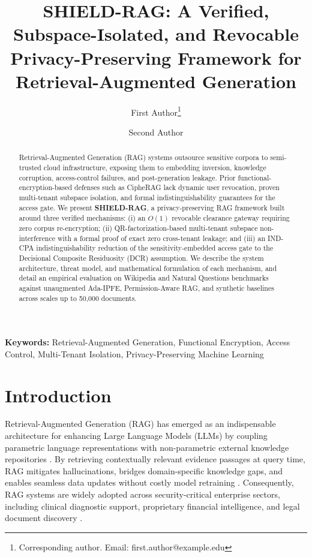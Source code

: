 \documentclass[10pt,a4paper]{article}
\title{\bfseries\fontsize{14pt}{16pt}\selectfont SHIELD-RAG: A Verified, Subspace-Isolated, and Revocable Privacy-Preserving Framework for Retrieval-Augmented Generation}
\author[1]{First Author\thanks{Corresponding author. Email: first.author@example.edu}}
\author[2]{Second Author}
\affil[1]{Department of Computer Science and Engineering, University Name, City, Country}
\affil[2]{Department of Computer Science and Engineering, University Name, City, Country}
\date{}
\begin{document}
\maketitle

\begin{abstract}
\noindent Retrieval-Augmented Generation (RAG) systems outsource sensitive corpora to semi-trusted cloud infrastructure, exposing them to embedding inversion, knowledge corruption, access-control failures, and post-generation leakage. Prior functional-encryption-based defenses such as CipheRAG lack dynamic user revocation, proven multi-tenant subspace isolation, and formal indistinguishability guarantees for the access gate. We present \textbf{SHIELD-RAG}, a privacy-preserving RAG framework built around three verified mechanisms: (i) an $O(1)$ revocable clearance gateway requiring zero corpus re-encryption; (ii) QR-factorization-based multi-tenant subspace non-interference with a formal proof of exact zero cross-tenant leakage; and (iii) an IND-CPA indistinguishability reduction of the sensitivity-embedded access gate to the Decisional Composite Residuosity (DCR) assumption. We describe the system architecture, threat model, and mathematical formulation of each mechanism, and detail an empirical evaluation on Wikipedia and Natural Questions benchmarks against unaugmented Ada-IPFE, Permission-Aware RAG, and synthetic baselines across scales up to 50,000 documents.
\end{abstract}

\noindent\textbf{Keywords:} Retrieval-Augmented Generation, Functional Encryption, Access Control, Multi-Tenant Isolation, Privacy-Preserving Machine Learning

\vspace{0.5em}

\section{Introduction}
\label{sec:intro}

Retrieval-Augmented Generation (RAG) has emerged as an indispensable architecture for enhancing Large Language Models (LLMs) by coupling parametric language representations with non-parametric external knowledge repositories \cite{lewis2020rag}. By retrieving contextually relevant evidence passages at query time, RAG mitigates hallucinations, bridges domain-specific knowledge gaps, and enables seamless data updates without costly model retraining \cite{shuster2021retrieval, khan2025evidencebot}. Consequently, RAG systems are widely adopted across security-critical enterprise sectors, including clinical diagnostic support, proprietary financial intelligence, and legal document discovery \cite{jeong2025permissionaware}.
\end{document}
